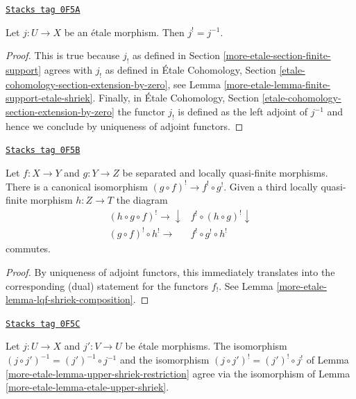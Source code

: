 \begin{lemma}
\label{more-etale-lemma-etale-upper-shriek}
\href{https://stacks.math.columbia.edu/tag/0F5A}{\texttt{Stacks tag 0F5A}}

Let $j : U \to X$ be an \'etale morphism. Then $j^! = j^{-1}$.
\end{lemma}

\begin{proof}
This is true because $j_!$ as defined in
Section \ref{more-etale-section-finite-support}
agrees with $j_!$ as defined in \'Etale Cohomology, Section
\ref{etale-cohomology-section-extension-by-zero}, see
Lemma \ref{more-etale-lemma-finite-support-etale-shriek}. Finally, in
\'Etale Cohomology, Section \ref{etale-cohomology-section-extension-by-zero}
the functor $j_!$ is defined
as the left adjoint of $j^{-1}$ and hence we conclude by
uniqueness of adjoint functors.
\end{proof}

\begin{lemma}
\label{more-etale-lemma-upper-shriek-restriction}
\href{https://stacks.math.columbia.edu/tag/0F5B}{\texttt{Stacks tag 0F5B}}

Let $f : X \to Y$ and $g : Y \to Z$ be separated and locally quasi-finite
morphisms. There is a canonical isomorphism $(g \circ f)^! \to f^! \circ g^!$.
Given a third locally quasi-finite morphism $h : Z \to T$
the diagram
$$
\begin{array}{cc}(h \circ g \circ f)^! \longrightarrow\downarrow & f^! \circ (h \circ g)^! \downarrow \\ (g \circ f)^! \circ h^! \longrightarrow & f^! \circ g^! \circ h^!\end{array}
$$
commutes.
\end{lemma}

\begin{proof}
By uniqueness of adjoint functors, this immediately translates
into the corresponding (dual) statement for the functors $f_!$.
See Lemma \ref{more-etale-lemma-lqf-shriek-composition}.
\end{proof}

\begin{lemma}
\label{more-etale-lemma-upper-shriek-restriction-etale}
\href{https://stacks.math.columbia.edu/tag/0F5C}{\texttt{Stacks tag 0F5C}}

Let $j : U \to X$ and $j' : V \to U$ be \'etale morphisms.
The isomorphism $(j \circ j')^{-1} = (j')^{-1} \circ j^{-1}$
and the isomorphism $(j \circ j')^! = (j')^! \circ j^!$ of
Lemma \ref{more-etale-lemma-upper-shriek-restriction}
agree via the isomorphism of Lemma \ref{more-etale-lemma-etale-upper-shriek}.
\end{lemma}


